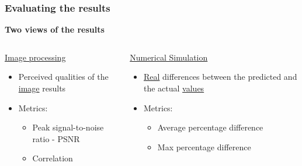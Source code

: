 \documentclass[18pt]{beamer}
\begin{document}
\begin{frame}[t]
  \frametitle{Evaluating the results}
  \begin{center}
    \textbf{\Large Two views of the results}
  \end{center}
  \vspace{-1cm}
  \begin{columns}[t]
    \begin{column}{0.5\textwidth}
      \begin{center}
        {\large \underline{Image processing}}
        \begin{itemize}
        \item Perceived qualities of the \underline{image} results
        \item Metrics:
          \begin{itemize}
          \item Peak signal-to-noise ratio - PSNR
          \item Correlation
          \end{itemize}
        \end{itemize}
      \end{center}
    \end{column}
    \begin{column}{0.5\textwidth}
      \begin{center}
        {\large \underline{Numerical Simulation}}
        \begin{itemize}
        \item \underline{Real} differences between the predicted and the actual \underline{values}
        \item Metrics:
          \begin{itemize}
            \item Average percentage difference
            \item Max percentage difference
          \end{itemize}
        \end{itemize}
      \end{center}  
    \end{column}
  \end{columns}
\end{frame}
\end{document}
